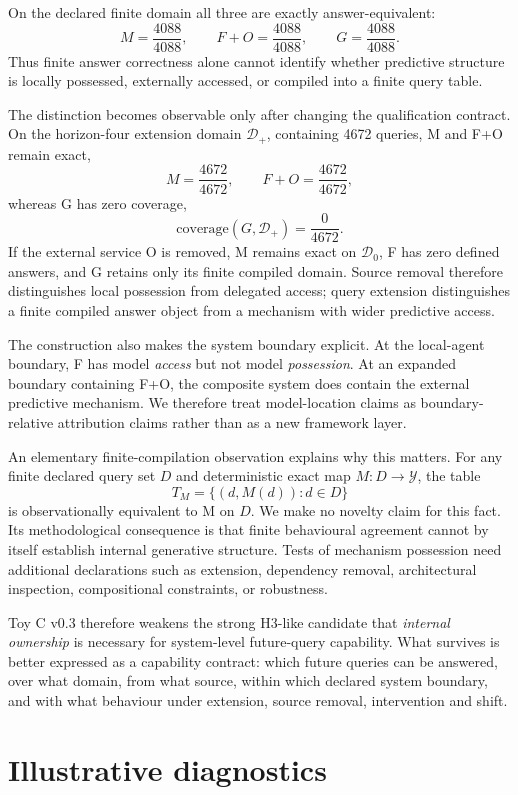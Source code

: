 \documentclass[10pt]{article}
\begin{document}
On the declared finite domain all three are exactly answer-equivalent:
\[
M=\frac{4088}{4088},
\qquad
F+O=\frac{4088}{4088},
\qquad
G=\frac{4088}{4088}.
\]
Thus finite answer correctness alone cannot identify whether predictive structure is locally possessed, externally accessed, or compiled into a finite query table.

The distinction becomes observable only after changing the qualification contract. On the horizon-four extension domain $\mathcal D_+$, containing 4672 queries, M and F+O remain exact,
\[
M=\frac{4672}{4672},
\qquad
F+O=\frac{4672}{4672},
\]
whereas G has zero coverage,
\[
\mathrm{coverage}(G,\mathcal D_+)=\frac{0}{4672}.
\]
If the external service O is removed, M remains exact on $\mathcal D_0$, F has zero defined answers, and G retains only its finite compiled domain. Source removal therefore distinguishes local possession from delegated access; query extension distinguishes a finite compiled answer object from a mechanism with wider predictive access.

The construction also makes the system boundary explicit. At the local-agent boundary, F has model \emph{access} but not model \emph{possession}. At an expanded boundary containing F+O, the composite system does contain the external predictive mechanism. We therefore treat model-location claims as boundary-relative attribution claims rather than as a new framework layer.

An elementary finite-compilation observation explains why this matters. For any finite declared query set $D$ and deterministic exact map $M:D\to\mathcal Y$, the table
\[
T_M=\{(d,M(d)):d\in D\}
\]
is observationally equivalent to M on $D$. We make no novelty claim for this fact. Its methodological consequence is that finite behavioural agreement cannot by itself establish internal generative structure. Tests of mechanism possession need additional declarations such as extension, dependency removal, architectural inspection, compositional constraints, or robustness.

Toy C v0.3 therefore weakens the strong H3-like candidate that \emph{internal ownership} is necessary for system-level future-query capability. What survives is better expressed as a capability contract: which future queries can be answered, over what domain, from what source, within which declared system boundary, and with what behaviour under extension, source removal, intervention and shift.

\section{Illustrative diagnostics}
\end{document}
